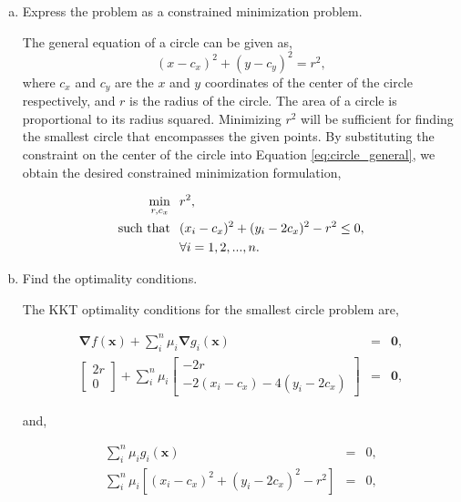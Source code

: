 \documentclass{article}
\newcommand{\exspace}{\hspace{0.1in}}
\begin{document}
\begin{enumerate}[a)]

\item Express the problem as a constrained minimization problem.

The general equation of a circle can be given as,
\begin{equation} \label{eq:circle_general}
(x - c_x)^2 + (y - c_y)^2 = r^2,
\end{equation}
where $c_x$ and $c_y$ are the $x$ and $y$ coordinates of the center of the circle respectively, and $r$ is the radius of the circle.
The area of a circle is proportional to its radius squared.
Minimizing $r^2$ will be sufficient for finding the smallest circle that encompasses the given points.
By substituting the constraint on the center of the circle into Equation \ref{eq:circle_general}, we obtain the desired constrained minimization formulation,

\begin{align*}
\min_{r, c_x} \exspace & r^2, \\
\text{such that} \exspace & (x_i - c_x)^2 + (y_i - 2c_x)^2 - r^2 \le 0, \\
& \forall i = 1, 2, ..., n.
\end{align*}

\item Find the optimality conditions.

The KKT optimality conditions for the smallest circle problem are,

\begin{eqnarray*}
\boldsymbol{\nabla} f(\mathbf{x}) + \sum_{i}^{n} \mu_i \boldsymbol{\nabla} g_i(\mathbf{x}) &=& \mathbf{0},\\
\begin{bmatrix}2r \\ 0\end{bmatrix} + \sum_{i}^{n} \mu_i \begin{bmatrix}-2r \\ -2(x_i - c_x) - 4(y_i - 2c_x)\end{bmatrix} &=& \mathbf{0},
\end{eqnarray*}

and,

\begin{eqnarray*}
\sum_{i}^{n} \mu_i g_i(\mathbf{x}) &=& 0,\\
\sum_{i}^{n} \mu_i \left[(x_i - c_x)^2 + (y_i - 2c_x)^2 - r^2\right] &=& 0,
\end{eqnarray*}


\end{enumerate}
\end{document}
